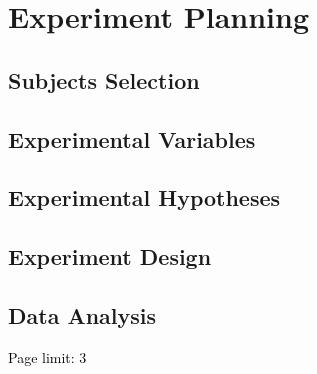 \section{Experiment Planning}

\subsection{Subjects Selection}
\subsection{Experimental Variables}
\subsection{Experimental Hypotheses}
\subsection{Experiment Design}
\subsection{Data Analysis}

\textcolor{black}{Page limit: 3}
 